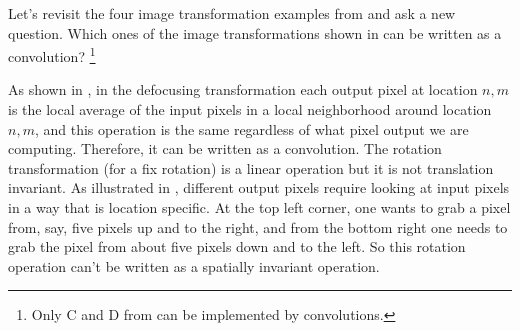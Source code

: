 %
%

Let's revisit the four image transformation examples from \fig{\ref{fig:transformationsquizz}} and ask a new question. Which ones of the image transformations shown in \fig{\ref{fig:transformationsquizz}} can be written as a convolution? 
\footnote{Only C and D from \fig{\ref{fig:transformationsquizz}} can be implemented by convolutions.}%

As shown in , in the defocusing transformation each output pixel at location $n,m$ is the local average of the input pixels in a local neighborhood around location $n,m$, and this operation is the same regardless of what pixel output we are computing. Therefore, it can be written as a convolution. The rotation transformation (for a fix rotation) is a linear operation but it is not translation invariant. As illustrated in , different output pixels require looking at input pixels in a way that is location specific. At the top left corner, one wants to grab a pixel from, say, five pixels up and to the right, and from the bottom right one needs to grab the pixel from about five pixels down and to the left. So this rotation operation can't be written as a spatially invariant operation.

